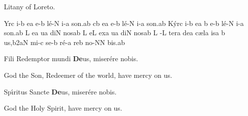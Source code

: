 \beginhymn Litany of Loreto.

\def\loreto#1{{\hskip10mm \itlyrics #1 }}

\Internote
\nosolesmescustos
\initiumgregorianum
{}%
\sgn {}Yr\punctum c\egn
\sgn {}i-\punctum b\egn
\sgn {}e{}\punctum a\egn
\spatium
\sgn {}e-\punctum b\egn
\sgn l{\'e}-\punctum N\egn
\sgn {}i-\punctum a\egn
\sgn so{n.}\punctum a\augmentum b\egn
\spatium
\divisiofinalis
\spatium
{}\clivis cb\egn
\sgn {}e{}\punctum a\egn
\spatium
\sgn {}e-\punctum b\egn
\sgn l{\'e}-\punctum N\egn
\sgn {}i-\punctum a\egn
\sgn so{n.}\punctum a\augmentum b\egn
\spatium
\divisiofinalis
\spatium
\sgn K{\'y}r\punctum c\egn
\sgn {}i-\punctum b\egn
\sgn {}e{}\punctum a\egn
\spatium
\custos b
\lineaproxima
\sgn {}e-\punctum b\egn
\sgn l{\'e}-\punctum N\egn
\sgn {}i-\punctum a\egn
\sgn so{n.}\punctum a\augmentum b\egn
\spatium
\divisiofinalis
\spatium
{}\punctum L\egn
\sgn {}e{}\punctum a\egn
\spatium
{}u\punctum a\egn
\sgn di{}\punctum N\egn
\spatium
\sgn nos\punctum a\augmentum b\egn
\spatium
\divisiofinalis
\spatium
{}\punctum L\egn
\sgn {}e{}\punctum L\egn
\spatium
\sgn {}ex\punctum a\egn
{}u\punctum a\egn
\sgn di{}\punctum N\egn
\spatium
\sgn nos\punctum a\augmentum b\egn
\spatium
\divisiofinalis
\spatium
\custos L
\lineaproxima
{}-\punctum L\egn
\sgn ter\punctum a\egn
\spatium
\sgn de{}\punctum a\egn
\spatium
\sgn c{\ae}l\punctum a\egn
\sgn {}is\punctum a\egn
\spatium
{}\punctum b\egn
\sgn {}u{s,}\episem b2\clivis aN\egn
\spatium
\fissum{5pt}
\divisiomaior
\spatium
\fissum{5pt}
\sgn mi-\punctum c\egn
\sgn se-\punctum b\egn
\sgn r{\'e}-\punctum a\egn
\sgn re{}\punctum b\egn
\spatium
\sgn n{o}-\punctum N\augmentum N\egn
\sgn bi{s.}\punctum a\augmentum b\egn
\Finisgregoriana

\medskip


F{i}li Redemptor mundi {\bf De}us, miser\'ere nobis.

\loreto{God the Son, Redeemer of the world, have mercy on us.}

Sp\'\i ritus Sancte {\bf De}us, miser\'ere nobis.

\loreto{God the Holy Spirit, have mercy on us.}

